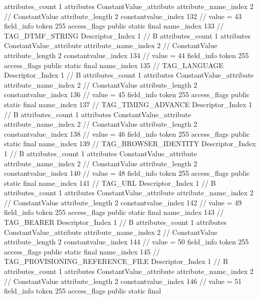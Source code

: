 {{{{{				attributes_count	1
				attributes {
				ConstantValue_attribute {
					attribute_name_index	2		// ConstantValue
					attribute_length	2
					constantvalue_index	132		// value = 43
				}
				}
			}
			field_info {
				token	255
				access_flags	public static final
				name_index	133		// TAG_DTMF_STRING
				Descriptor_Index	1		// B
				attributes_count	1
				attributes {
				ConstantValue_attribute {
					attribute_name_index	2		// ConstantValue
					attribute_length	2
					constantvalue_index	134		// value = 44
				}
				}
			}
			field_info {
				token	255
				access_flags	public static final
				name_index	135		// TAG_LANGUAGE
				Descriptor_Index	1		// B
				attributes_count	1
				attributes {
				ConstantValue_attribute {
					attribute_name_index	2		// ConstantValue
					attribute_length	2
					constantvalue_index	136		// value = 45
				}
				}
			}
			field_info {
				token	255
				access_flags	public static final
				name_index	137		// TAG_TIMING_ADVANCE
				Descriptor_Index	1		// B
				attributes_count	1
				attributes {
				ConstantValue_attribute {
					attribute_name_index	2		// ConstantValue
					attribute_length	2
					constantvalue_index	138		// value = 46
				}
				}
			}
			field_info {
				token	255
				access_flags	public static final
				name_index	139		// TAG_BROWSER_IDENTITY
				Descriptor_Index	1		// B
				attributes_count	1
				attributes {
				ConstantValue_attribute {
					attribute_name_index	2		// ConstantValue
					attribute_length	2
					constantvalue_index	140		// value = 48
				}
				}
			}
			field_info {
				token	255
				access_flags	public static final
				name_index	141		// TAG_URL
				Descriptor_Index	1		// B
				attributes_count	1
				attributes {
				ConstantValue_attribute {
					attribute_name_index	2		// ConstantValue
					attribute_length	2
					constantvalue_index	142		// value = 49
				}
				}
			}
			field_info {
				token	255
				access_flags	public static final
				name_index	143		// TAG_BEARER
				Descriptor_Index	1		// B
				attributes_count	1
				attributes {
				ConstantValue_attribute {
					attribute_name_index	2		// ConstantValue
					attribute_length	2
					constantvalue_index	144		// value = 50
				}
				}
			}
			field_info {
				token	255
				access_flags	public static final
				name_index	145		// TAG_PROVISIONING_REFERENCE_FILE
				Descriptor_Index	1		// B
				attributes_count	1
				attributes {
				ConstantValue_attribute {
					attribute_name_index	2		// ConstantValue
					attribute_length	2
					constantvalue_index	146		// value = 51
				}
				}
			}
			field_info {
				token	255
				access_flags	public static final
}}}}}
